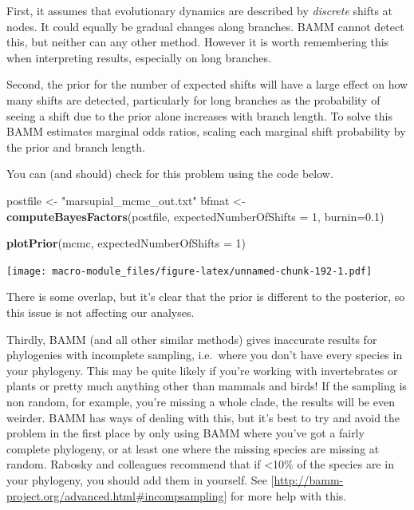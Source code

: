 \documentclass[]{book}
\newenvironment{Shaded}{\begin{snugshade}}{\end{snugshade}}
\newcommand{\KeywordTok}[1]{\textcolor[rgb]{0.13,0.29,0.53}{\textbf{{#1}}}}
\newcommand{\DataTypeTok}[1]{\textcolor[rgb]{0.13,0.29,0.53}{{#1}}}
\newcommand{\DecValTok}[1]{\textcolor[rgb]{0.00,0.00,0.81}{{#1}}}
\newcommand{\FloatTok}[1]{\textcolor[rgb]{0.00,0.00,0.81}{{#1}}}
\newcommand{\StringTok}[1]{\textcolor[rgb]{0.31,0.60,0.02}{{#1}}}
\newcommand{\NormalTok}[1]{{#1}}
\theoremstyle{definition}
\theoremstyle{definition}
\theoremstyle{definition}
\theoremstyle{remark}
\begin{document}
First, it assumes that evolutionary dynamics are described by
\emph{discrete} shifts at nodes. It could equally be gradual changes
along branches. BAMM cannot detect this, but neither can any other
method. However it is worth remembering this when interpreting results,
especially on long branches.

Second, the prior for the number of expected shifts will have a large
effect on how many shifts are detected, particularly for long branches
as the probability of seeing a shift due to the prior alone increases
with branch length. To solve this BAMM estimates marginal odds ratios,
scaling each marginal shift probability by the prior and branch length.

You can (and should) check for this problem using the code below.

\begin{Shaded}
\begin{Highlighting}[]
\NormalTok{postfile <-}\StringTok{ "marsupial_mcmc_out.txt"}
\NormalTok{bfmat <-}\StringTok{ }\KeywordTok{computeBayesFactors}\NormalTok{(postfile, }\DataTypeTok{expectedNumberOfShifts =} \DecValTok{1}\NormalTok{, }\DataTypeTok{burnin=}\FloatTok{0.1}\NormalTok{)}

\KeywordTok{plotPrior}\NormalTok{(mcmc, }\DataTypeTok{expectedNumberOfShifts =} \DecValTok{1}\NormalTok{)}
\end{Highlighting}
\end{Shaded}

\texttt{[image: macro-module\_files/figure-latex/unnamed-chunk-192-1.pdf]}

There is some overlap, but it's clear that the prior is different to the
posterior, so this issue is not affecting our analyses.

Thirdly, BAMM (and all other similar methods) gives inaccurate results
for phylogenies with incomplete sampling, i.e.~where you don't have
every species in your phylogeny. This may be quite likely if you're
working with invertebrates or plants or pretty much anything other than
mammals and birds! If the sampling is non random, for example, you're
missing a whole clade, the results will be even weirder. BAMM has ways
of dealing with this, but it's best to try and avoid the problem in the
first place by only using BAMM where you've got a fairly complete
phylogeny, or at least one where the missing species are missing at
random. Rabosky and colleagues recommend that if \textless{}10\% of the
species are in your phylogeny, you should add them in yourself. See
{[}\url{http://bamm-project.org/advanced.html\#incompsampling}{]} for
more help with this.
\end{document}

